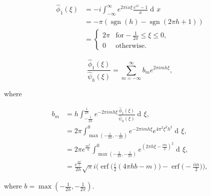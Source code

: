 \documentclass[14pt]{article}
\DeclareMathOperator{\diff}{d\!}
\DeclareMathOperator{\sgn}{sgn}
\DeclareMathOperator{\erf}{erf}
\begin{document}
\begin{align}
  \hat{\phi}_1(\xi) &=-i\int_{-\infty}^{\infty} e^{2\pi i x\xi}\frac{e^{i x}-1}{x}\diff x\\
  &= -\pi(\sgn(h) - \sgn(2\pi h + 1)) \\
  &= \begin{cases}
    2\pi & \mathrm{for} -\frac{1}{2\pi} \leq \xi \leq 0, \\
    0 & \mathrm{otherwise}.
    \end{cases}
\end{align}

\begin{equation}
  \frac{\hat{\phi}_1(\xi)}{\hat{\psi}_h(\xi)} = \sum_{m=-\infty}^{\infty}b_me^{2\pi i m h\xi},
\end{equation}

\noindent where

\begin{align}
  b_m &= h\int_{-\frac{1}{2h}}^{\frac{1}{2h}} e^{-2\pi i m h \xi}\frac{\hat{\phi}_1(\xi)}{\hat{\psi}_h(\xi)} \diff\xi, \\
  &= 2\pi\int_{\max(-\frac{1}{2h}, -\frac{1}{2\pi})}^{0} e^{-2\pi i m h \xi}e^{4\pi^2\xi^2h^2} \diff\xi, \\
  &= 2\pi e^{\frac{m^2}{4}}\int_{\max(-\frac{1}{2h}, -\frac{1}{2\pi})}^{0} e^{(2\pi h \xi - \frac{i m}{2})^2} \diff\xi, \\
  &= \frac{e^\frac{m^2}{4}}{2h}\sqrt{\pi}i\Bigg(\erf\Big(\frac{i}{2}(4\pi h b - m)\Big) - \erf\Big(-\frac{i m}{2}\Big)\Bigg),
\end{align}

\noindent where $b=\max(-\frac{1}{2h}, -\frac{1}{2\pi})$.
\end{document}
